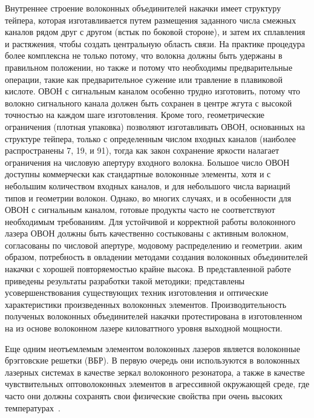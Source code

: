 Внутреннее строение волоконных объединителей накачки имеет структуру тейпера, которая изготавливается путем размещения заданного числа смежных каналов рядом друг с другом (встык по боковой стороне), и затем их сплавления и растяжения, чтобы создать центральную область связи. На практике процедура более комплексна не только потому, что волокна должны быть удержаны в правильном положении, но также и потому что необходимы предварительные операции, такие как предварительное сужение или травление в плавиковой кислоте. ОВОН с сигнальным каналом особенно трудно изготовить, потому что волокно сигнального канала должен быть сохранен в центре жгута с высокой точностью на каждом шаге изготовления. Кроме того, геометрические ограничения (плотная упаковка) позволяют изготавливать ОВОН, основанных на структуре тейпера, только с определенным числом входных каналов (наиболее распространены 7, 19, и 91), тогда как закон сохранение яркости налагает ограничения на числовую апертуру входного волокна. Большое число ОВОН доступны коммерчески как стандартные волоконные элементы, хотя и с небольшим количеством входных каналов, и для небольшого числа вариаций типов и геометрии волокон. Однако, во многих случаях, и в особенности для ОВОН с сигнальным каналом, готовые продукты часто не соответствуют необходимым требованиям. Для устойчивой и корректной работы волоконного лазера ОВОН должны быть качественно состыкованы с активным волокном, согласованы по числовой апертуре, модовому распределению и геометрии.
аким образом, потребность в овладении методами создания волоконных объединителей накачки с хорошей повторяемостью крайне высока. В представленной работе приведены результаты разработки такой методики; представлены усовершенствования существующих техник изготовления и оптические характеристики произведенных волоконных элементов. Производительность полученых волоконных объединителей накачки протестирована в изготовленном на из основе волоконном лазере киловаттного уровня выходной мощности.

Еще одним неотъемлемым элементом волоконных лазеров является волоконные брэгговские решетки (ВБР). В первую очередь они используются в волоконных лазерных системах в качестве зеркал волоконного резонатора, а также в качестве чувствительных оптоволоконных элементов в агрессивной окружающей среде, где часто они должны  сохранять свои физические свойства при очень высоких температурах~\cite{into_fbg_1,into_fbg_2,into_fbg_3}.

